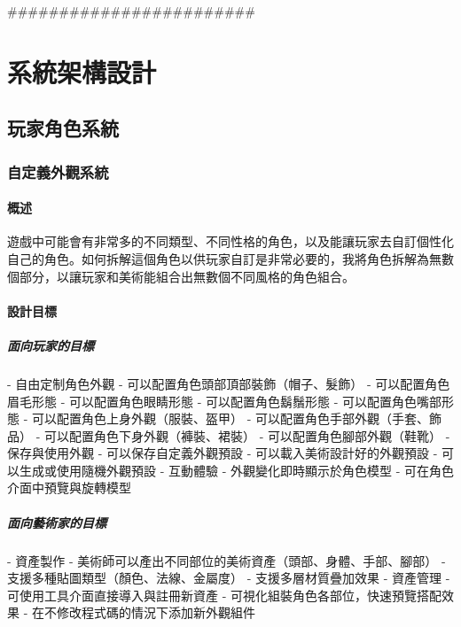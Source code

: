 ########################
\fi

\chapter{系統架構設計}
\section{玩家角色系統}
\subsection{自定義外觀系統}
\subsubsection{概述}
遊戲中可能會有非常多的不同類型、不同性格的角色，以及能讓玩家去自訂個性化自己的角色。如何拆解這個角色以供玩家自訂是非常必要的，我將角色拆解為無數個部分，以讓玩家和美術能組合出無數個不同風格的角色組合。
\subsubsection{設計目標}

\paragraph{\Large\bfseries 面向玩家的目標}
\begin{markdown}
- 自由定制角色外觀
    - 可以配置角色頭部頂部裝飾（帽子、髮飾）
    - 可以配置角色眉毛形態
    - 可以配置角色眼睛形態
    - 可以配置角色鬍鬚形態
    - 可以配置角色嘴部形態
    - 可以配置角色上身外觀（服裝、盔甲）
    - 可以配置角色手部外觀（手套、飾品）
    - 可以配置角色下身外觀（褲裝、裙裝）
    - 可以配置角色腳部外觀（鞋靴）
- 保存與使用外觀
    - 可以保存自定義外觀預設
    - 可以載入美術設計好的外觀預設
    - 可以生成或使用隨機外觀預設
- 互動體驗
    - 外觀變化即時顯示於角色模型
    - 可在角色介面中預覽與旋轉模型
\end{markdown}

\paragraph{\Large\bfseries 面向藝術家的目標}
\begin{markdown}
- 資產製作
    - 美術師可以產出不同部位的美術資產（頭部、身體、手部、腳部）
    - 支援多種貼圖類型（顏色、法線、金屬度）
    - 支援多層材質疊加效果
- 資產管理
    - 可使用工具介面直接導入與註冊新資產
    - 可視化組裝角色各部位，快速預覽搭配效果
    - 在不修改程式碼的情況下添加新外觀組件
\end{markdown}

